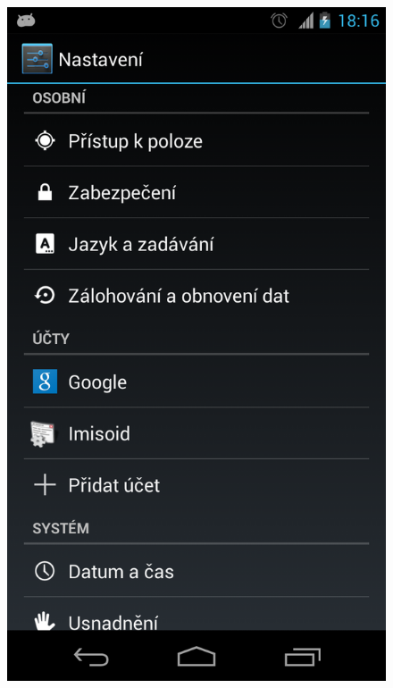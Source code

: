 \documentclass{diplomka}
\begin{document}
\begin{figure}[H]
\centering
\begin{minipage}{.5\textwidth}
  \centering
  \includegraphics[width=.75\linewidth]{scr/setting.png}
  \label{obr:setting}
\end{minipage}%
\begin{minipage}{.5\textwidth}
  \centering

\end{minipage}
\end{figure}
\end{document}

